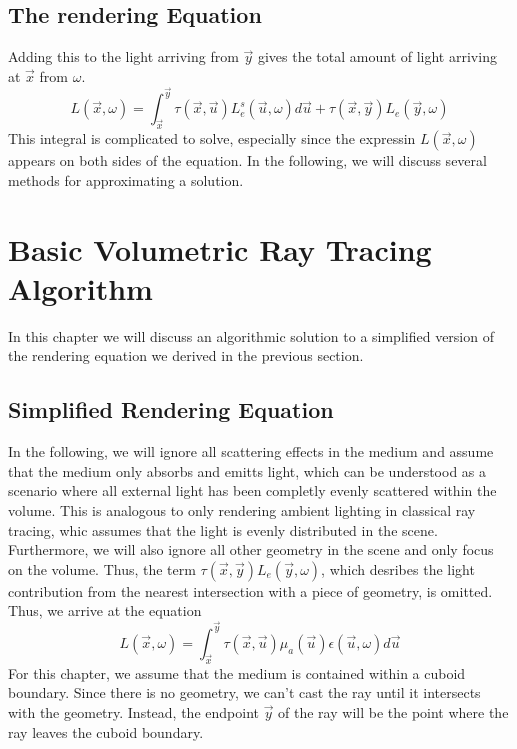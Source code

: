 \subsection{The rendering Equation}
Adding this to the light arriving from $\vec{y}$ gives the total amount of light arriving at $\vec{x}$ from $\omega $.
\begin{equation}
L(\vec{x}, \omega ) = \int_{\vec{x}}^{\vec{y}} \tau(\vec{x}, \vec{u})L_e^s(\vec{u}, \omega )d\vec{u} + \tau(\vec{x}, \vec{y}) L_e(\vec{y}, \omega )
\end{equation}
This integral is complicated to solve, especially since the expressin $L(\vec{x}, \omega )$ appears on both sides of the equation.
In the following, we will discuss several methods for approximating a solution.




\section{Basic Volumetric Ray Tracing Algorithm}
In this chapter we will discuss an algorithmic solution to a simplified version of the rendering equation we derived in the previous section.
\subsection{Simplified Rendering Equation}
In the following, we will ignore all scattering effects in the medium and assume that the medium only absorbs and emitts light, which can be understood as a scenario where all external light has been completly evenly scattered within the volume. This is analogous to only rendering ambient lighting in classical ray tracing, whic assumes that the light is evenly distributed in the scene.
Furthermore, we will also ignore all other geometry in the scene and only focus on the volume. Thus, the term $\tau(\vec{x}, \vec{y}) L_e(\vec{y}, \omega )$, which desribes the light contribution from the nearest intersection with a piece of geometry, is omitted.
Thus, we arrive at the equation
\begin{equation}
L(\vec{x}, \omega ) = \int_{\vec{x}}^{\vec{y}} \tau(\vec{x}, \vec{u}){\mu}_a(\vec{u})\epsilon (\vec{u}, \omega)d\vec{u}
\end{equation}
For this chapter, we assume that the medium is contained within a cuboid boundary. Since there is no geometry, we can't cast the ray until it intersects with the geometry. Instead, the endpoint $\vec{y}$ of the ray will be the point where the ray leaves the cuboid boundary.

